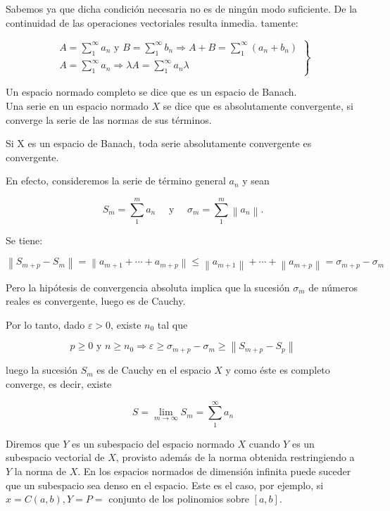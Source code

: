 \documentclass[10pt]{article}
\theoremstyle{plain}
\theoremstyle{definition}
\theoremstyle{remark}
\begin{document}
Sabemos ya que dicha condición necesaria no es de ningún modo suficiente. De la continuidad de las operaciones vectoriales resulta inmedia. tamente:

\[
\left.\begin{array}{l}
A=\sum_{1}^{\infty} a_{n} \text { y } B=\sum_{1}^{\infty} b_{n} \Rightarrow A+B=\sum_{1}^{\infty}\left(a_{n}+b_{n}\right)  \tag{2-3}\\
A=\sum_{1}^{\infty} a_{n} \Rightarrow \lambda A=\sum_{1}^{\infty} a_{n} \lambda
\end{array}\right\}
\]

Un espacio normado completo se dice que es un espacio de Banach.\\
Una serie en un espacio normado $X$ se dice que es absolutamente convergente, si converge la serie de las normas de sus términos.

Si X es un espacio de Banach, toda serie absolutamente convergente es convergente.

En efecto, consideremos la serie de término general $a_{n}$ y sean

$$
S_{m}=\sum_{1}^{m} a_{n} \quad \text { y } \quad \sigma_{m}=\sum_{1}^{m}\left\|a_{n}\right\| .
$$

Se tiene:

$$
\left\|S_{m+p}-S_{m}\right\|=\left\|a_{m+1}+\cdots+a_{m+p}\right\| \leqslant\left\|a_{m+1}\right\|+\cdots+\left\|a_{m+p}\right\|=\sigma_{m+p}-\sigma_{m}
$$

Pero la hipótesis de convergencia absoluta implica que la sucesión $\sigma_{m}$ de números reales es convergente, luego es de Cauchy.

Por lo tanto, dado $\varepsilon>0$, existe $n_{0}$ tal que

$$
p \geqslant 0 \text { y } n \geqslant n_{0} \Rightarrow \varepsilon \geqslant \sigma_{m+p}-\sigma_{m} \geqslant\left\|S_{m+p}-S_{p}\right\|
$$

luego la sucesión $S_{m}$ es de Cauchy en el espacio $X$ y como éste es completo converge, es decir, existe

$$
S=\lim _{m \rightarrow \infty} S_{m}=\sum_{1}^{\infty} a_{n}
$$

Diremos que $Y$ es un subespacio del espacio normado $X$ cuando $Y$ es un subespacio vectorial de $X$, provisto además de la norma obtenida restringiendo a $Y$ la norma de $X$. En los espacios normados de dimensión infinita puede suceder que un subespacio sea denso en el espacio. Este es el caso, por ejemplo, si $x=C(a, b), Y=P=$ conjunto de los polinomios sobre $[a, b]$.
\end{document}
